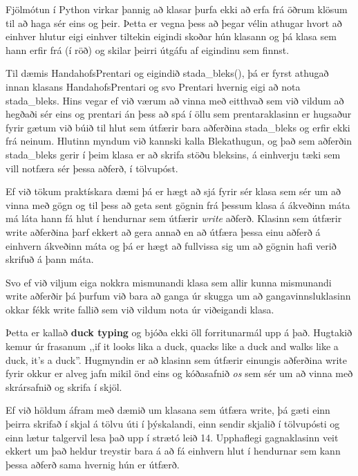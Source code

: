 Fjölmótun í Python virkar þannig að klasar þurfa ekki að erfa frá öðrum klösum til að haga sér eins og þeir.
Þetta er vegna þess að þegar vélin athugar hvort að einhver hlutur eigi einhver tiltekin eigindi skoðar hún klasann og þá klasa sem hann erfir frá (í röð) og skilar þeirri útgáfu af eigindinu sem finnst.

Til dæmis HandahofsPrentari og eigindið stada\_bleks(), þá er fyrst athugað innan klasans HandahofsPrentari og svo Prentari hvernig eigi að nota stada\_bleks.
Hins vegar ef við værum að vinna með eitthvað sem við vildum að hegðaði sér eins og prentari án þess að spá í öllu sem prentaraklasinn er hugsaður fyrir gætum við búið til hlut sem útfærir bara aðferðina stada\_bleks og erfir ekki frá neinum.
Hlutinn myndum við kannski kalla Blekathugun, og það sem aðferðin stada\_bleks gerir í þeim klasa er að skrifa stöðu bleksins, á einhverju tæki sem vill notfæra sér þessa aðferð, í tölvupóst.

Ef við tökum praktískara dæmi þá er hægt að sjá fyrir sér klasa sem sér um að vinna með gögn og til þess að geta sent gögnin frá þessum klasa á ákveðinn máta má láta hann fá hlut í hendurnar sem útfærir \textit{write} aðferð.
Klasinn sem útfærir write aðferðina þarf ekkert að gera annað en að útfæra þessa einu aðferð á einhvern ákveðinn máta og þá er hægt að fullvissa sig um að gögnin hafi verið skrifuð á þann máta.

Svo ef við viljum eiga nokkra mismunandi klasa sem allir kunna mismunandi write aðferðir þá þurfum við bara að ganga úr skugga um að gangavinnsluklasinn okkar fékk write fallið sem við vildum nota úr viðeigandi klasa.

Þetta er kallað \textbf{duck typing} og bjóða ekki öll forritunarmál upp á það.
Hugtakið kemur úr frasanum ,,if it looks lika a duck, quacks like a duck and walks like a duck, it's a duck''.
Hugmyndin er að klasinn sem útfærir einungis aðferðina write fyrir okkur er alveg jafn mikil önd eins og kóðasafnið \textit{os} sem sér um að vinna með skrársafnið og skrifa í skjöl.

Ef við höldum áfram með dæmið um klasana sem útfæra write, þá gæti einn þeirra skrifað í skjal á tölvu úti í þýskalandi, einn sendir skjalið í tölvupósti og einn lætur talgervil lesa það upp í strætó leið 14.
Upphaflegi gagnaklasinn veit ekkert um það heldur treystir bara á að fá einhvern hlut í hendurnar sem kann þessa aðferð sama hvernig hún er útfærð.